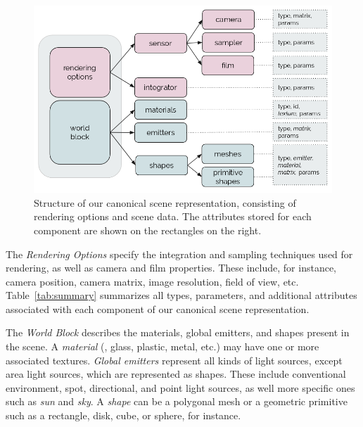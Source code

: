 \begin{figure}[h]
  \includegraphics[width=\textwidth,height=\textheight,keepaspectratio]{images/4_system_architecture/canonicalrep.png}
  \caption{Structure of our canonical scene representation, consisting of rendering options and scene data. The attributes stored for each component are shown on the rectangles on the right.}
  \label{fig:canonicalrep}
\end{figure}

The \textit{Rendering Options}
specify the integration and sampling techniques used for
rendering, as well as camera and film properties. These include, for instance, camera position, camera matrix, image resolution, field of view, etc.
Table~\ref{tab:summary} summarizes all types, parameters, and additional attributes associated with each component of our canonical scene representation. 

The \textit{World Block} describes the materials, global emitters, and shapes present in the scene.
%
A {\it material} (\eg, glass, plastic, metal, etc.) may have one or more associated textures. {\it Global emitters} represent all kinds of light sources, except area light sources, which are represented as shapes. These include conventional environment, spot, directional, and point light sources, as well more specific ones such as {\it sun} and {\it sky}.
%
A {\it shape} can be a polygonal mesh or a geometric primitive such as a rectangle, disk, cube, or sphere, for instance. 

